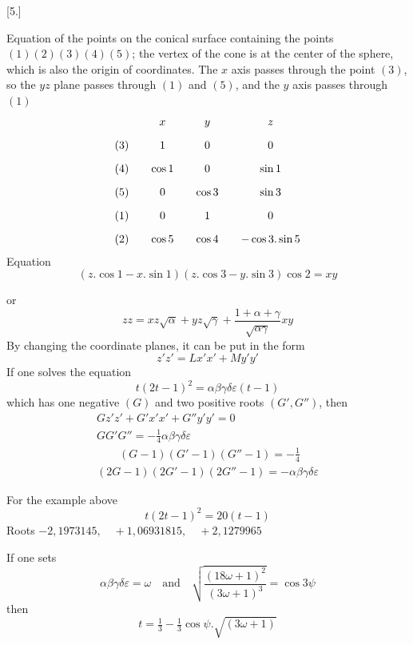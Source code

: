 \begingroup
\renewcommand{\arraystretch}{1.45}
\fancyhead[L]{}
\providecommand{\EqOverGt}{\mathrel{\substack{=\\>}}}
\par\medskip{}\centerline{[5.]}\nobreak\smallskip
Equation of the points on the conical surface containing the points $(1)(2)(3)(4)(5)$; the vertex of the cone is at the center of the sphere, which is also the origin of coordinates. The $x$ axis passes through the point $(3)$, so the $yz$ plane passes through $(1)$ and $(5)$, and the $y$ axis passes through $(1)$
\[
\begin{array}{c@{\qquad}c@{\qquad}c@{\qquad}c} &x&y&z\\[9pt] (3)&1&0&0\\[9pt] (4)&\cos1&0&\sin1\\[9pt] (5)&0&\cos3&\sin3\\[9pt] (1)&0&1&0\\[9pt] (2)&\cos5&\cos4&-\cos3\mathord{.}\sin5 \end{array}
\]
Equation
\[
(z\mathord{.}\cos1-x\mathord{.}\sin1)(z\mathord{.}\cos3-y\mathord{.}\sin3)\cos2=xy
\]




or
\[
zz=xz\surd{\alpha}+yz\surd{\gamma}+\frac{1+\alpha+\gamma}{\surd{\alpha\gamma}}xy
\]
By changing the coordinate planes, it can be put in the form
\[
z'z'=Lx'x'+My'y'
\]
If one solves the equation
\[
t(2t-1)^2=\alpha\beta\gamma\delta\varepsilon(t-1)
\]
which has one negative $(G)$ and two positive roots $(G',G'')$, then
\[
\begin{gathered} Gz'z'+G'x'x'+G''y'y'=0\\[9pt] GG'G''=-\tfrac14\alpha\beta\gamma\delta\varepsilon\\[9pt] \qquad(G-1)(G'-1)(G''-1)=-\tfrac14\\[9pt] (2G-1)(2G'-1)(2G''-1)=-\alpha\beta\gamma\delta\varepsilon \end{gathered}
\]

For the example above
\[
t(2t-1)^2=20(t-1)
\]
Roots\quad
$-2{,}1973145,\quad+1{,}06931815,\quad+2{,}1279965$

If one sets
\[
\alpha\beta\gamma\delta\varepsilon=\omega\quad\text{and}\quad \surd{\frac{(18\omega+1)^2}{(3\omega+1)^{3}}}=\cos3\psi
\]
then
\[
t=\tfrac13-\tfrac13\cos\psi\mathord{.}\surd{(3\omega+1)}
\]


